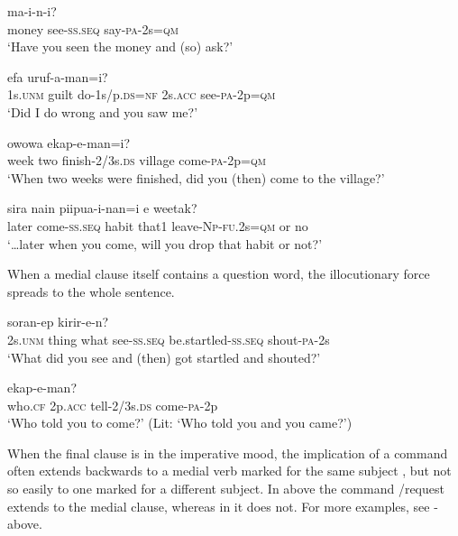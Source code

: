 \ea%
\label{ex:8:x1899}
  ma-i-n-i? \\
money  see-\textsc{ss}.\textsc{seq}  say-\textsc{pa}-2s=\textsc{qm}\\
\glt `Have you seen the money and (so) ask?'
\z

\ea%
\label{ex:8:x1900}
\gll [Yo  pina  on-amkun=ko]  efa  uruf-a-man=i?\\
1s.\textsc{unm}  guilt  do-1s/p.\textsc{ds}=\textsc{nf}  2s.\textsc{acc}  see-\textsc{pa}-2p=\textsc{qm}\\
\glt `Did I do wrong and you saw me?'
\z

\ea%
\label{ex:8:x1901}
  owowa  ekap-e-man=i? \\
week  two  finish-2/3s.\textsc{ds}  village  come-\textsc{pa}-2p=\textsc{qm}\\
\glt `When two weeks were finished, did you (then) come to the village?'
\z

\ea%
\label{ex:8:x1902}
  sira  nain  piipua-i-nan=i  e  weetak? \\
later  come-\textsc{ss}.\textsc{seq}  habit  that1  leave-\textsc{Np}-\textsc{fu}.2s=\textsc{qm}  or  no\\
\glt `{\dots}later when you come, will you drop that habit or not?'
\z


When a medial clause itself contains a question word, the illocutionary force spreads to the whole sentence. 

\ea%
\label{ex:8:x1363}
  soran-ep  kirir-e-n?\\
2s.\textsc{unm}  thing  what  see-\textsc{ss}.\textsc{seq}  be.startled-\textsc{ss}.\textsc{seq}  shout-\textsc{pa}-2s\\
\glt `What did you see and (then) got startled and shouted?'
\z

\ea%
\label{ex:8:x1903}
  ekap-e-man? \\
who.\textsc{cf}  2p.\textsc{acc}  tell-2/3s.\textsc{ds}  come-\textsc{pa}-2p\\
\glt `Who told you to come?' (Lit: `Who told you and you came?')
\z


When the final clause is in the imperative mood, the implication of a command often extends backwards to a medial verb marked for the same subject , but not so easily to one marked for a different subject. In  above the command /request extends to the medial clause, whereas in  it does not. For more examples, see - above.

